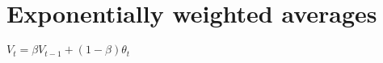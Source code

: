\documentclass{article}
\begin{document}
\section*{Exponentially weighted averages}
$V_{t} = \beta V_{t-1} + (1-\beta) \theta_{t}$
\end{document}
